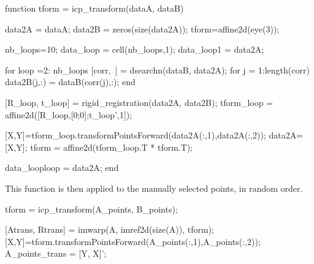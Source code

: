 \begin{matlab}
function tform = icp_transform(dataA, dataB)

data2A = dataA;
data2B = zeros(size(data2A));
tform=affine2d(eye(3));

nb_loops=10;
data_loop = cell(nb_loops,1);
data_loop{1} = data2A;

for loop =2: nb_loops
    [corr,~] = dsearchn(dataB, data2A);
    for j = 1:length(corr)
        data2B(j,:) = dataB(corr(j),:);
    end
    
    [R_loop, t_loop] = rigid_registration(data2A, data2B);
    tform_loop = affine2d([R_loop,[0;0];t_loop',1]);
    
    [X,Y]=tform_loop.transformPointsForward(data2A(:,1),data2A(:,2));
    data2A=[X,Y];
    tform = affine2d(tform_loop.T * tform.T);

    data_loop{loop} = data2A;
end
\end{matlab}

This function is then applied to the manually selected points, in random order.
\begin{matlab}
tform = icp_transform(A_points, B_points);

[Atrans, Rtrans] = imwarp(A, imref2d(size(A)), tform);
[X,Y]=tform.transformPointsForward(A_points(:,1),A_points(:,2));
A_points_trans = [Y, X]';
\end{matlab}


